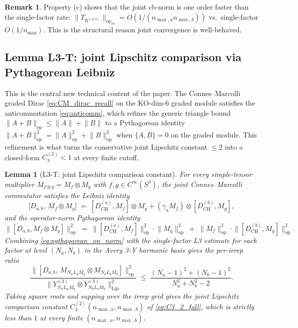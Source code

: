 \documentclass[11pt,a4paper]{article}
\theoremstyle{plain}
\newtheorem{lemma}[theorem]{Lemma}
\theoremstyle{definition}
\newtheorem{remark}[theorem]{Remark}
\newcommand{\nmax}{n_{\max}}
\newcommand{\nmaxa}{n_{\max,a}}
\newcommand{\nmaxb}{n_{\max,b}}
\newcommand{\sthree}{S^{3}}
\newcommand{\opnorm}[1]{\lVert #1 \rVert_{\mathrm{op}}}
\newcommand{\norm}[1]{\lVert #1 \rVert}
\newcommand{\Mat}{M}
\newcommand{\DCH}{D_{\mathrm{CH}}}
\newcommand{\KS}{K}
\begin{document}
\begin{remark}\label{rem:cb_norm_rate}
Property (c) shows that the joint cb-norm is one order faster than the
single-factor rate: $\opnorm{T_{\KS^{(a,b)}}}_{\mathrm{cb}} =
O(1/(\nmaxa \nmaxb))$ vs.\ single-factor $O(1/\nmax)$. This is the
structural reason joint convergence is well-behaved.
\end{remark}

\subsection{Lemma L3-T: joint Lipschitz comparison via Pythagorean
Leibniz}\label{sec:L3-T}

This is the central new technical content of the paper. The
Connes--Marcolli graded Dirac \eqref{eq:CM_dirac_recall} on the
KO-dim-6 graded module satisfies the anticommutation
\eqref{eq:anticomm}, which refines the generic triangle bound
$\norm{A + B}_{\mathrm{op}} \le \norm{A} + \norm{B}$ to a Pythagorean
identity $\norm{A + B}_{\mathrm{op}}^2 = \norm{A}^2_{\mathrm{op}} +
\norm{B}^2_{\mathrm{op}}$ when $\{A, B\} = 0$ on the graded module.
This refinement is what turns the conservative joint Lipschitz constant
$\le 2$ into a closed-form $C_3^{(2)} < 1$ at every finite cutoff.

\begin{lemma}[L3-T: joint Lipschitz comparison constant]\label{lem:L3-T}
For every simple-tensor multiplier $\Mat_{f \otimes g} = \Mat_f
\otimes \Mat_g$ with $f, g \in C^\infty(\sthree)$, the joint
Connes--Marcolli commutator satisfies the Leibniz identity
\begin{equation}\label{eq:joint_leibniz}
   \bigl[D_{a,b},\, \Mat_f \otimes \Mat_g\bigr]
   \;=\; [\DCH^{(a)}, \Mat_f] \otimes \Mat_g
        + (\gamma_a \Mat_f) \otimes [\DCH^{(b)}, \Mat_g],
\end{equation}
and the operator-norm Pythagorean identity
\begin{equation}\label{eq:pythagorean_op_norm}
   \bigl\|[D_{a,b}, \Mat_f \otimes \Mat_g]\bigr\|_{\mathrm{op}}^2
   \;=\; \opnorm{[\DCH^{(a)}, \Mat_f]}^2 \cdot \opnorm{\Mat_g}^2
        \;+\; \opnorm{\Mat_f}^2 \cdot \opnorm{[\DCH^{(b)}, \Mat_g]}^2.
\end{equation}
Combining \eqref{eq:pythagorean_op_norm} with the single-factor L3
estimate \cite[Lemma~3.5]{loutey_paper38} for each factor at level
$(N_a, N_b)$ in the Avery 3-Y harmonic basis gives the per-irrep ratio
\begin{equation}\label{eq:per_irrep_ratio_T}
   \frac{\opnorm{[D_{a,b},\, \Mat_{N_a L_a M_a} \otimes
                                \Mat_{N_b L_b M_b}]}^2}
        {\norm{Y^{(3)}_{N_a L_a M_a} \otimes Y^{(3)}_{N_b L_b M_b}}_{\mathrm{Lip}}^2}
   \;\le\; \frac{(N_a - 1)^2 + (N_b - 1)^2}{N_a^2 + N_b^2 - 2}.
\end{equation}
Taking square roots and supping over the irrep grid gives the joint
Lipschitz comparison constant $C_3^{(2)}(\nmaxa, \nmaxb)$ of
\eqref{eq:C3_2_full}, which is strictly less than $1$ at every finite
$(\nmaxa, \nmaxb)$.
\end{lemma}
\end{document}

